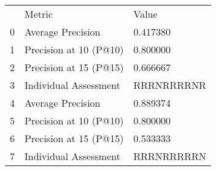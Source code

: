 \begin{tabular}{lll}
 & Metric & Value \\
0 & Average Precision & 0.417380 \\
1 & Precision at 10 (P@10) & 0.800000 \\
2 & Precision at 15 (P@15) & 0.666667 \\
3 & Individual Assessment & RRRNRRRRNR \\
4 & Average Precision & 0.889374 \\
5 & Precision at 10 (P@10) & 0.800000 \\
6 & Precision at 15 (P@15) & 0.533333 \\
7 & Individual Assessment & RRRNRRRRRN \\
\end{tabular}
